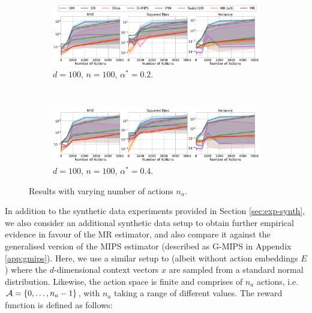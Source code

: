  \begin{figure}[ht]
     \centering
    \begin{subfigure}[b]{0.8\textwidth}
         \centering
         \includegraphics[width=\textwidth]{figures/mr/all_baselines/ope_vs_nac_dimc_100_alphatar_0.2_neval_100_ntrain_100000.png}
         \caption{$d=100$, $n = 100$, $\alpha^\ast = 0.2$.}
         \label{fig:mse-vs-nac-conf2a}
     \end{subfigure}\\
     \begin{subfigure}[b]{0.8\textwidth}
         \centering
         \includegraphics[width=\textwidth]{figures/mr/all_baselines/ope_vs_nac_dimc_100_alphatar_0.4_neval_100_ntrain_100000.png}
         \caption{$d=100$, $n = 100$, $\alpha^\ast = 0.4$.}
         \label{fig:mse-vs-nac-conf2b}
     \end{subfigure}
     \caption{Results with varying number of actions $n_{a}$.}
     \label{fig:mse-vs-nac-conf2}
 \end{figure}

In addition to the synthetic data experiments provided in Section \ref{sec:exp-synth}, we also consider an additional synthetic data setup to obtain further empirical evidence in favour of the MR estimator, and also compare it against the generalised version of the MIPS estimator (described as G-MIPS in Appendix \ref{app:gmips}).
Here, we use a similar setup to \cite{saito2022off} (albeit without action embeddings $E$) where the $d$-dimensional context vectors $x$ are sampled from a standard normal distribution. Likewise, the action space is finite and comprises of $n_a$ actions, i.e.\ $\mathcal{A} = \{0, \dots, n_a-1\}$, with $n_a$ taking a range of different values. The reward function is defined as follows:

